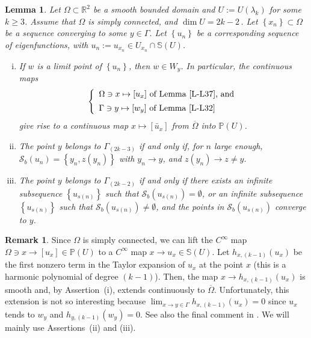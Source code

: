\documentclass[12pt,a4paper]{amsart}
\theoremstyle{plain} %
\newtheorem{lemma}[theorem]{Lemma}
\theoremstyle{definition}
\newtheorem{remark}[theorem]{Remark}
\numberwithin{equation}{section}
\numberwithin{figure}{section}
\numberwithin{table}{section}
\newcommand{\bP}{\mathbb{P}}
\newcommand{\R}{\mathbb{R}}
\newcommand{\bS}{\mathbb{S}}
\newcommand{\cS}{\mathcal{S}}
\newcommand{\set}[1]{\left\lbrace #1 \right\rbrace}
\begin{document}
\begin{lemma}\label{L-L38}
Let $\Omega \subset \R^2$ be a smooth bounded domain and $U := U(\lambda_k)$ for some $k \ge 3$.  Assume that $\Omega$ is simply connected, and $\dim U = 2k-2\,$. Let $\set{x_n} \subset \Omega$ be a sequence converging to some $y \in \Gamma $.  Let $\set{u_n}$ be a corresponding sequence of eigenfunctions, with $u_n  := u_{x_n} \in U_{x_n}\cap \bS(U)$.
\begin{enumerate}[(i)]
   \item If $w$ is a limit point of $\set{u_n}$, then $w \in W_y$. In particular, the continuous maps
%
\begin{equation*}
\left\{
\begin{array}{l}
\Omega \ni x \mapsto [u_x] \text{~of Lemma~\ref{L-L37}, and}\\[5pt]
\Gamma  \ni y \mapsto [w_y] \text{~of Lemma~\ref{L-L32}}
\end{array}
\right.
\end{equation*}
%
give rise to a continuous map $x\mapsto [\bar{u}_x]$ from $\overline{\Omega}$ into $\bP(U)$.
  \item  The point $y$ belongs to $\Gamma_{(2k -3)}$ if and only if,
for $n$ large enough, $\cS_b(u_{n}) = \set{y_{n},z(y_{n})}$ with $y_{n} \to y$, and $z(y_{n}) \to z \not = y$.
  \item  The point $y$ belongs to $\Gamma_{(2k -2)}$ if and only if there exists an infinite subsequence $\set{u_{s(n)}}$  such that $\cS_b(u_{s(n)})= \emptyset$,  or  an infinite subsequence  $\set{u_{s(n)}}$  such that $\cS_b(u_{s(n)}) \neq \emptyset$, and  the points in $\cS_b(u_{s(n)})$ converge to $y$.
\end{enumerate}
\end{lemma}%



\begin{remark}\label{R-L38-2}
Since $\Omega$ is simply connected, we can lift the $C^{\infty}$ map $\Omega \ni x \to [u_x] \in \bP(U)$ to a $C^{\infty}$ map $x \to u_x \in \bS(U)$. Let $h_{x,(k-1)}(u_x)$ be the first nonzero term in the Taylor expansion of $u_x$ at the point $x$ (this is a harmonic polynomial of degree $(k-1)$). Then, the map $x \to h_{x,(k-1)}(u_x)$ is smooth and, by Assertion~(i), extends continuously to $\overline{\Omega}$. Unfortunately, this extension is not so interesting because $\lim_{x \to y \in \Gamma } h_{x,(k-1)}(u_x) = 0$ since $u_x$ tends to $w_y$ and $h_{y,(k-1)}(w_y) = 0$.  See also the final comment in \cite{BeNP2016}. We will mainly use Assertions~(ii) and (iii).
\end{remark}%
\end{document}
